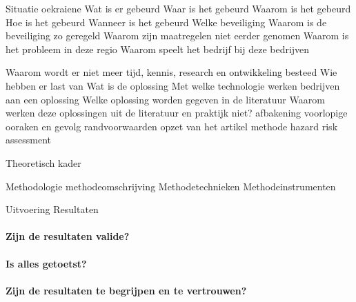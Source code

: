 		Situatie oekraiene
		Wat is er gebeurd
		Waar is het gebeurd
		Waarom is het gebeurd
		Hoe is het gebeurd
		Wanneer is het gebeurd
		Welke beveiliging
		Waarom is de beveiliging zo geregeld
		Waarom zijn maatregelen niet eerder genomen
		Waarom is het probleem in deze regio
		Waarom speelt het bedrijf bij deze bedrijven
		
		Waarom wordt er niet meer tijd, kennis, research en ontwikkeling besteed
		Wie hebben er last van
		Wat is de oplossing
		Met welke technologie werken bedrijven aan een oplossing
		Welke oplossing worden gegeven in de literatuur
		Waarom werken deze oplossingen uit de literatuur en praktijk niet?
		afbakening
		voorlopige ooraken en gevolg
		randvoorwaarden
		opzet van het artikel
		methode hazard risk assessment
		
		Theoretisch kader
		
		Methodologie
		methodeomschrijving
		Methodetechnieken
		Methodeinstrumenten
		
		Uitvoering
		Resultaten
		\paragraph{Zijn de resultaten valide?}
		
		\paragraph{Is alles getoetst?}
		
		\paragraph{Zijn de resultaten te begrijpen en te vertrouwen?}
		
